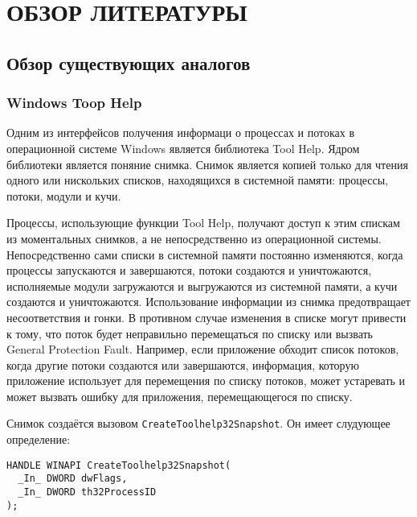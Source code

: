 \section{ОБЗОР ЛИТЕРАТУРЫ}
\label{sec:domain}

\subsection{Обзор существующих аналогов}
\label{sub:domain:analogs}

\subsubsection{Windows Toop Help}
\label{sub:domain:analogs:windows}

Одним из интерфейсов получения информаци о процессах и потоках в операционной
системе Windows является библиотека Tool Help\cite{tool_help_article}. Ядром
библиотеки является поняние снимка. Снимок является копией только для чтения
одного или нискольких списков, находящихся в системной памяти:
процессы, потоки, модули и кучи.

Процессы, использующие функции Tool Help, получают доступ к этим спискам из
моментальных снимков, а не непосредственно из операционной системы.
Непосредственно сами списки в системной памяти постоянно изменяются, когда
процессы запускаются и завершаются, потоки создаются и уничтожаются, исполняемые
модули загружаются и выгружаются из системной памяти, а кучи создаются и
уничтожаются. Использование информации из снимка предотвращает несоответствия и
гонки. В противном случае изменения в списке могут привести к тому, что поток
будет неправильно перемещаться по списку или вызвать General Protection Fault.
Например, если приложение обходит список потоков, когда другие потоки создаются
или завершаются, информация, которую приложение использует для перемещения по
списку потоков, может устаревать и может вызвать ошибку для приложения,
перемещающегося по списку.

Снимок создаётся вызовом \texttt{CreateToolhelp32Snapshot}. Он имеет слудующее
определение\cite{win_tool_help}:

\medskip
\begin{adjustwidth}{\fivecharsapprox}{}
\begin{lstlisting}[basicstyle=\fontencoding{T1}\small\ttfamily]
HANDLE WINAPI CreateToolhelp32Snapshot(
  _In_ DWORD dwFlags,
  _In_ DWORD th32ProcessID
);
\end{lstlisting}
\end{adjustwidth}
\medskip

